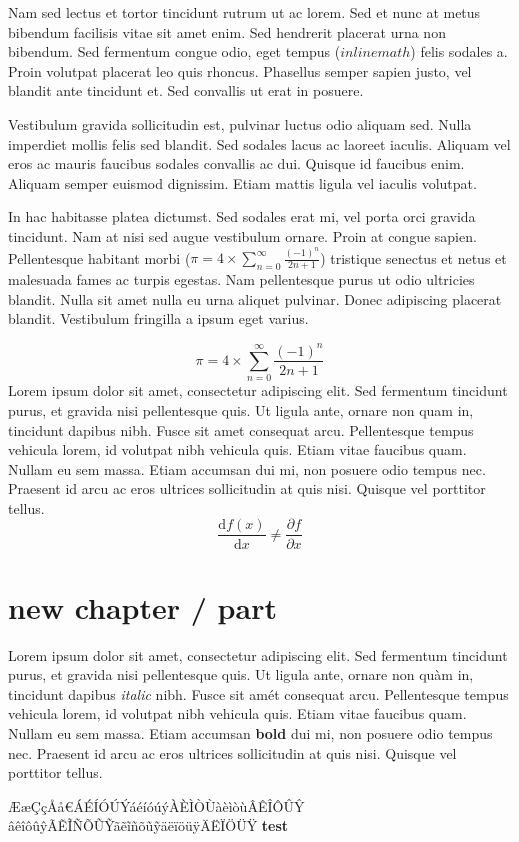 \documentclass{report}
\begin{document}
Nam sed lectus et tortor tincidunt rutrum ut ac lorem. Sed et nunc at metus bibendum facilisis vitae sit amet enim. Sed hendrerit placerat urna non bibendum. Sed fermentum congue odio, eget tempus ($inline math$) felis sodales a. Proin volutpat placerat leo quis rhoncus. Phasellus semper sapien justo, vel blandit ante tincidunt et. Sed convallis ut erat in posuere.

Vestibulum gravida sollicitudin est, pulvinar luctus odio aliquam sed. Nulla imperdiet mollis felis sed blandit. Sed sodales lacus ac laoreet iaculis. Aliquam vel eros ac mauris faucibus sodales convallis ac dui. Quisque id faucibus enim. Aliquam semper euismod dignissim. Etiam mattis ligula vel iaculis volutpat.

In hac habitasse platea dictumst. Sed sodales erat mi, vel porta orci gravida tincidunt. Nam at nisi sed augue vestibulum ornare. Proin at congue sapien. Pellentesque habitant morbi ($\pi = 4 \times \sum _{n=0} ^{\infty} \frac{(-1)^n}{2n+1}$) tristique senectus et netus et malesuada fames ac turpis egestas. Nam pellentesque purus ut odio ultricies blandit. Nulla sit amet nulla eu urna aliquet pulvinar. Donec adipiscing placerat blandit. Vestibulum fringilla a ipsum eget varius.

$$\pi = 4 \times \sum _{n=0} ^{\infty} \frac{(-1)^n}{2n+1}$$
Lorem ipsum dolor sit amet, consectetur adipiscing elit. Sed fermentum tincidunt purus, et gravida nisi pellentesque quis. Ut ligula ante, ornare non quam in, tincidunt dapibus nibh. Fusce sit amet consequat arcu. Pellentesque tempus vehicula lorem, id volutpat nibh vehicula quis. Etiam vitae faucibus quam. Nullam eu sem massa. Etiam accumsan dui mi, non posuere odio tempus nec. Praesent id arcu ac eros ultrices sollicitudin at quis nisi. Quisque vel porttitor tellus.
$$\frac{\mathrm{d}f(x)}{\mathrm{d} x} \neq \frac{{\partial}f}{{\partial} x}$$

\part{new chapter / part}

Lorem ipsum dolor sit amet, consectetur adipiscing elit. Sed fermentum tincidunt purus, et gravida nisi pellentesque quis. Ut ligula ante, ornare non qu{\`a}m in, tincidunt dapibus \textit{italic} nibh. Fusce sit am{\'e}t consequat arcu. Pellentesque tempus vehicula lorem, id volutpat nibh vehicula quis. Etiam vitae faucibus quam. Nullam eu sem massa. Etiam accumsan \textbf{bold} dui mi, non posuere odio tempus nec. Praesent id arcu ac eros ultrices sollicitudin at quis nisi. Quisque vel porttitor tellus.

{\AE{}}{\ae{}}{\c{C}}{\c{c}}{\r{A}}{\r{a}}{\euro{}}{\'A}{\'E}{\'I}{\'O}{\'U}{\'Y}{\'a}{\'e}{\'i}{\'o}{\'u}{\'y}{\`A}{\`E}{\`I}{\`O}{\`U}{\`a}{\`e}{\`i}{\`o}{\`u}{\^A}{\^E}{\^I}{\^O}{\^U}{\^Y}
{\^a}{\^e}{\^i}{\^o}{\^u}{\^y}{\~A}{\~E}{\~I}{\~N}{\~O}{\~U}{\~Y}{\~a}{\~e}{\~i}{\~n}{\~o}{\~u}{\~y}{\"a}{\"e}{\"i}{\"o}{\"u}{\"y}{\"A}{\"E}{\"I}{\"O}{\"U}{\"Y}
  \textbf{test}

    
\end{document}
